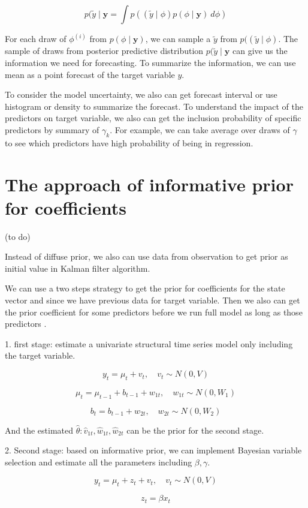 $$p(\tilde y \mid \mathbf{y} = \int p((\tilde y \mid \phi)p(\phi \mid \mathbf{y})~d \phi)$$



For each draw of $\phi^{(i)}$ from $p(\phi \mid \mathbf{y})$, we can sample a $\tilde y$ from $p((\tilde y \mid \phi)$. The sample of draws from posterior predictive distribution $p(\tilde y \mid \mathbf{y}$ can give us the information we need for forecasting. To summarize the information, we can use mean as a point forecast of the target variable $y$.

To consider the model uncertainty, we also can get forecast interval or use histogram or density to summarize the forecast. To understand the impact of the predictors on target variable, we also can get the inclusion probability of specific predictors by summary of $\gamma_k$. For example, we can take average over draws of $\gamma$ to see which predictors have high probability of being in regression. 


\section{The approach of informative prior for coefficients}

(to do)

Instead of diffuse prior, we also can use data from observation to get prior as initial value in Kalman filter algorithm. 






We can use a two steps strategy to get the prior for coefficients for the state vector and since we have previous data for target variable.  Then we also can get the prior coefficient for some predictors before we run full model as long as those predictors .  



1. first stage: estimate a univariate structural time series model only including the target variable.  



$$y_t = \mu_t +  v_{t}, \quad v_{t} \sim N(0, V)$$  




$$\mu_t = \mu_{t-1} + b_{t-1} + w_{1t}, \quad w_{1t} \sim N(0, W_{1})$$  




$$b_t = b_{t-1} + w_{2t}, \quad w_{2t} \sim N(0, W_{2})$$  





And the estimated $\hat \theta: \hat v_{1t},\hat w_{1t}, \hat w_{2t}$ can be the prior for the second stage.  





2. Second stage: based on informative prior, we can implement Bayesian variable selection and estimate all the parameters including $\beta, \gamma$.   



$$y_t = \mu_t + z_t + v_{t}, \quad v_{t} \sim N(0, V)$$  



$$z_t = \beta x_t$$  










%